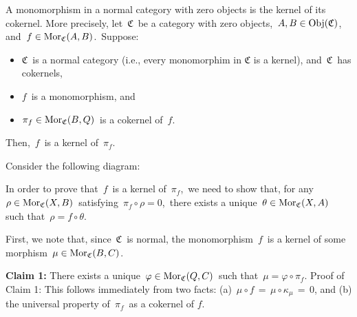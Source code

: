 \vskip 0.5cm
\begin{lemma}\label{AMorphismIsTheKernelOfItsCokernel}
\mbox{}
\vskip 0.1cm
\noindent
A monomorphism in a normal category with zero objects is the kernel of its cokernel.
\vskip 0.1cm
\noindent
More precisely, let \,$\mathfrak{C}$\, be a category with zero objects,
\,$A, B \in \textnormal{Obj}(\mathfrak{C})$,\, and
\,$f \in \textnormal{Mor}_{\mathfrak{C}}(A,B)$.\,
\vskip 0.1cm
\noindent
Suppose:
\begin{itemize}
\item
	$\mathfrak{C}$\, is a normal category (i.e., every monomorphim in $\mathfrak{C}$ is a kernel),
	and \,$\mathfrak{C}$\, has cokernels,
\item
	$f$\, is a monomorphism, and
\item
	$\pi_{f} \in \textnormal{Mor}_{\mathfrak{C}}(B,Q)$\, is a cokernel of \,$f$.
\end{itemize}
Then, \,$f$\, is a kernel of \,$\pi_{f}$.
\end{lemma}
\proof
Consider the following diagram:
\begin{center}
\end{center}
In order to prove that \,$f$\, is a kernel of \,$\pi_{f}$,\,
we need to show that, for any \,$\rho \in \textnormal{Mor}_{\mathfrak{C}}(X,B)$\,
satisfying \,$\pi_{f} \circ \rho = 0$,\,
there exists a unique \,$\theta \in \textnormal{Mor}_{\mathfrak{C}}(X,A)$\,
such that \,$\rho = f \circ \theta$.\,

\vskip 0.3cm
\noindent
First, we note that, since \,$\mathfrak{C}$\, is normal, the monomorphism \,$f$\, is a kernel of some morphism
\,$\mu \in \textnormal{Mor}_{\mathfrak{C}}(B,C)$.\,

\vskip 0.3cm
\noindent
\textbf{Claim 1:}\;\; There exists a unique \,$\varphi \in \textnormal{Mor}_{\mathfrak{C}}(Q,C)$\, such that \,$\mu = \varphi \circ \pi_{f}$.
\vskip 0.1cm
\noindent
Proof of Claim 1:\;
This follows immediately from two facts:
(a)	\,$\mu \circ f \,=\, \mu \circ \kappa_{\mu} \,=\, 0$, and
(b)	the universal property of \,$\pi_{f}$\, as a cokernel of $f$.

